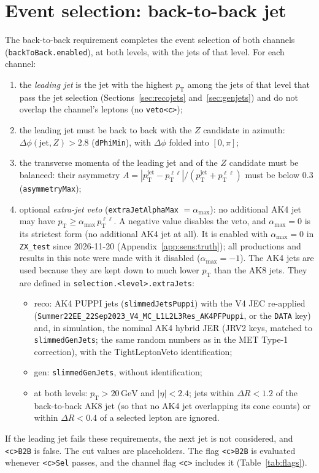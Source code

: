 \documentclass[11pt]{article}
\newcommand{\pt}{p_{\mathrm{T}}}
\newcommand{\GeV}{\ensuremath{\,\mathrm{GeV}}}
\newcommand{\ptll}{\pt^{\ell\ell}}
\newcommand{\ptj}{\pt^{\mathrm{jet}}}
\newcommand{\code}[1]{\texttt{#1}}
\begin{document}
\section{Event selection: back-to-back jet}
\label{sec:b2b}
The back-to-back requirement completes the event selection of both channels (\code{backToBack.enabled}), at both
levels, with the jets of that level. For each channel:
\begin{enumerate}
\item the \emph{leading jet} is the jet with the highest $\pt$ among the jets of that level that pass the jet selection
  (Sections~\ref{sec:recojets} and~\ref{sec:genjets}) and do not overlap the channel's leptons (no \code{veto<c>});
\item the leading jet must be back to back with the $Z$ candidate in azimuth: $\Delta\phi(\text{jet}, Z) > 2.8$
  (\code{dPhiMin}), with $\Delta\phi$ folded into $[0,\pi]$;
\item the transverse momenta of the leading jet and of the $Z$ candidate must be balanced: their asymmetry
  $A = |\ptj - \ptll| / (\ptj + \ptll)$ must be below 0.3 (\code{asymmetryMax});
\item optional \emph{extra-jet veto} (\code{extraJetAlphaMax} $= \alpha_\mathrm{max}$): no additional AK4 jet may
  have $\pt \geq \alpha_\mathrm{max}\,\ptll$. A negative value disables the veto, and $\alpha_\mathrm{max} = 0$ is its
  strictest form (no additional AK4 jet at all). It is enabled with $\alpha_\mathrm{max} = 0$ in \code{ZX\_test} since
  2026-11-20 (Appendix~\ref{app:sens:truth}); all productions and results in this note were made with it disabled
  ($\alpha_\mathrm{max} = -1$). The
  AK4 jets are used because they are kept down to much lower $\pt$ than the AK8 jets. They are defined in
  \code{selection.<level>.extraJets}:
  \begin{itemize}
  \item reco: AK4 PUPPI jets (\code{slimmedJetsPuppi}) with the V4 JEC re-applied
    (\code{Summer22EE\_\allowbreak{}22Sep2023\_\allowbreak{}V4\_\allowbreak{}MC\_\allowbreak{}L1L2L3Res\_\allowbreak{}AK4PFPuppi},
    or the \code{DATA} key) and, in simulation, the nominal AK4 hybrid JER (JRV2 keys, matched to
    \code{slimmedGenJets}; the same random numbers as in the MET Type-1 correction), with the TightLeptonVeto
    identification;
  \item gen: \code{slimmedGenJets}, without identification;
  \item at both levels: $\pt > 20\GeV$ and $|\eta| < 2.4$; jets within $\Delta R < 1.2$ of the back-to-back AK8 jet (so
    that no AK4 jet overlapping its cone counts) or within $\Delta R < 0.4$ of a selected lepton are ignored.
  \end{itemize}
\end{enumerate}
If the leading jet fails these requirements, the next jet is not considered, and \code{<c>B2B} is false. The cut values
are placeholders. The flag \code{<c>B2B} is evaluated whenever \code{<c>Sel} passes, and the channel flag \code{<c>}
includes it (Table~\ref{tab:flags}).
\end{document}

